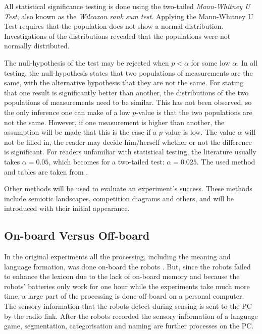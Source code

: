  All statistical significance testing is done using the two-tailed {\em Mann-Whitney U Test}, also known as the {\em Wilcoxon rank sum test}. Applying the Mann-Whitney U Test requires that the population does not show a normal distribution. Investigations of the distributions revealed that the populations were not normally distributed. 

The null-hypothesis of the test may be rejected when $p<\alpha$ for some low $\alpha$. In all testing, the null-hypothesis states that two populations of measurements are the same, with the alternative hypothesis that they are not the same. For stating that one result is significantly better than another, the distributions of the two populations of measurements need to be similar. This has not been observed, so the only inference one can make of a low $p$-value is that the two populations are not the same. However, if one measurement is higher than another, the assumption will be made that this is the case if a $p$-value is low. The value $\alpha$ will not be filled in, the reader may decide him/herself whether or not the difference is significant. For readers unfamiliar with statistical testing, the literature usually takes $\alpha=0.05$, which becomes for a two-tailed test: $\alpha=0.025$. The used method and tables are taken from \citep{aczel:1989}.


Other methods will be used to evaluate an experiment's success.
These methods include semiotic landscapes, competition diagrams and others, and
will be introduced with their initial appearance.


\subsection{On-board Versus Off-board}\label{s:lg:offboard}

In the original experiments all the processing, including the meaning and language formation, was done on-board the robots \citep{steelsvogt:1997}. But, since the robots failed to enhance the lexicon due to the lack of on-board memory and because the robots' batteries only work for one hour while the experiments take much more time, a large part of the processing is done off-board on a personal computer. The sensory information that the robots detect during sensing is sent to the PC by the radio link. After the robots recorded the sensory information of a language game, segmentation, categorisation and naming are further processes on the PC.

